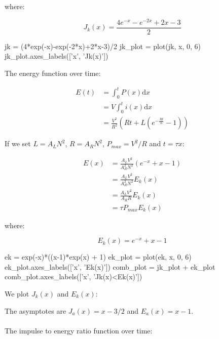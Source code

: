 \documentclass[]{../common/elementary-physics}
\begin{document}
where:

\begin{equation}
J_k(x) = \frac{4 e^{-x}-e^{-2x}+2x-3}{2}
\end{equation}

\begin{sagesilent}
jk = (4*exp(-x)-exp(-2*x)+2*x-3)/2
jk_plot = plot(jk, x, 0, 6)
jk_plot.axes_labels(['x', 'Jk(x)'])
\end{sagesilent}

The energy function over time:

\begin{subequations}
\begin{align}
E(t) &= \int^t_0 P(x) \mathrm{d}x \\
&= V \int^t_0 i(x) \mathrm{d}x \\
&= \frac{V^2}{R^2} (R t + L(e^{-\frac{R t}{L}} - 1))
\end{align}
\end{subequations}

If we set $L = A_L N^2$, $R = A_R N^2$, $P_{max} = V^2 / R$ and  $t = \tau x$:

\begin{subequations}
\begin{align}
E(x) &= \frac{A_L V^2}{A_R^2 N^2} (e^{-x}+x-1) \\
&= \frac{A_L V^2}{A_R^2 N^2} E_k(x) \\
&= \frac{A_L V^2}{A_R R} E_k(x) \\
&= \tau P_{max} E_k(x)
\end{align}
\end{subequations}

where:

\begin{equation}
E_k(x) = e^{-x}+x-1
\end{equation}

\begin{sagesilent}
ek = exp(-x)*((x-1)*exp(x) + 1)
ek_plot = plot(ek, x, 0, 6)
ek_plot.axes_labels(['x', 'Ek(x)'])
comb_plot = jk_plot + ek_plot
comb_plot.axes_labels(['x', 'Jk(x)<Ek(x)'])
\end{sagesilent}

We plot $J_k(x)$ and $E_k(x)$:


The asymptotes are $J_a(x) = x-3/2$ and $E_a(x) = x - 1$.\\
\\
The impulse to energy ratio function over time:
\end{document}
